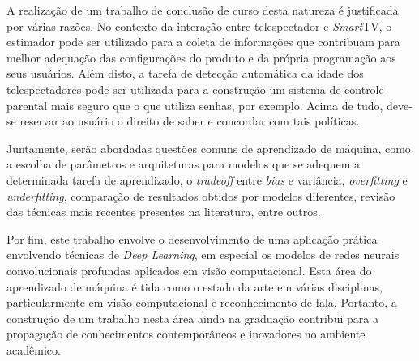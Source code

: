 A realização de um trabalho de conclusão de curso desta natureza é justificada por várias razões. No contexto da interação entre telespectador e \emph{Smart}TV, o estimador pode ser utilizado para a coleta de informações que contribuam para melhor adequação das configurações do produto e da própria programação aos seus usuários. Além disto, a tarefa de detecção automática da idade dos telespectadores pode ser utilizada para a construção um sistema de controle parental mais seguro que o que utiliza senhas, por exemplo. Acima de tudo, deve-se reservar ao usuário o direito de saber e concordar com tais políticas.

Juntamente, serão abordadas questões comuns de aprendizado de máquina, como a escolha de parâmetros e arquiteturas para modelos que se adequem a determinada tarefa de aprendizado, o \emph{tradeoff} entre \emph{bias} e variância, \emph{overfitting} e \emph{underfitting}, comparação de resultados obtidos por modelos diferentes, revisão das técnicas mais recentes presentes na literatura, entre outros.

Por fim, este trabalho envolve o desenvolvimento de uma aplicação prática envolvendo técnicas de \emph{Deep Learning}, em especial os modelos de redes neurais convolucionais profundas aplicados em visão computacional. Esta área do aprendizado de máquina é tida como o estado da arte em várias disciplinas, particularmente em visão computacional e reconhecimento de fala. Portanto, a construção de um trabalho nesta área ainda na graduação contribui para a propagação de conhecimentos contemporâneos e inovadores no ambiente acadêmico.
